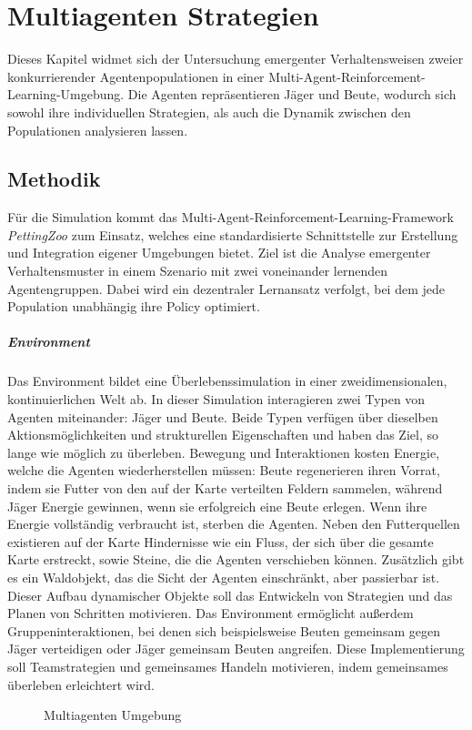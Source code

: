 \chapter{Multiagenten Strategien}
\label{chap:explorative}

Dieses Kapitel widmet sich der Untersuchung emergenter Verhaltensweisen zweier konkurrierender Agentenpopulationen in einer Multi-Agent-Reinforcement-Learning-Umgebung. Die Agenten repräsentieren Jäger und Beute, wodurch sich sowohl ihre individuellen Strategien, als auch die Dynamik zwischen den Populationen analysieren lassen.

\section{Methodik}

Für die Simulation kommt das Multi-Agent-Reinforcement-Learning-Framework \textit{PettingZoo} \cite{Terry_PettingZoo_Gym_for} zum Einsatz, welches eine standardisierte Schnittstelle zur Erstellung und Integration eigener Umgebungen bietet. Ziel ist die Analyse emergenter Verhaltensmuster in einem Szenario mit zwei voneinander lernenden Agentengruppen. Dabei wird ein dezentraler Lernansatz verfolgt, bei dem jede Population unabhängig ihre Policy optimiert.

\paragraph{Environment}
Das Environment bildet eine Überlebenssimulation in einer zweidimensionalen, kontinuierlichen Welt ab. In dieser Simulation interagieren zwei Typen von Agenten miteinander: Jäger und Beute. Beide Typen verfügen über dieselben Aktionsmöglichkeiten und strukturellen Eigenschaften und haben das Ziel, so lange wie möglich zu überleben. Bewegung und Interaktionen kosten Energie, welche die Agenten wiederherstellen müssen: Beute regenerieren ihren Vorrat, indem sie Futter von den auf der Karte verteilten Feldern sammelen, während Jäger Energie gewinnen, wenn sie erfolgreich eine Beute erlegen. Wenn ihre Energie vollständig verbraucht ist, sterben die Agenten. Neben den Futterquellen existieren auf der Karte Hindernisse wie ein Fluss, der sich über die gesamte Karte erstreckt, sowie Steine, die die Agenten verschieben können. Zusätzlich gibt es ein Waldobjekt, das die Sicht der Agenten einschränkt, aber passierbar ist. Dieser Aufbau dynamischer Objekte soll das Entwickeln von Strategien und das Planen von Schritten motivieren. Das Environment ermöglicht außerdem Gruppeninteraktionen, bei denen sich beispielsweise Beuten gemeinsam gegen Jäger verteidigen oder Jäger gemeinsam Beuten angreifen. Diese Implementierung soll Teamstrategien und gemeinsames Handeln motivieren, indem gemeinsames überleben erleichtert wird.
\newpage
\begin{figure}[htbp]
\centering
{}
\caption{Multiagenten Umgebung}
\label{fig:marl}
\end{figure}


